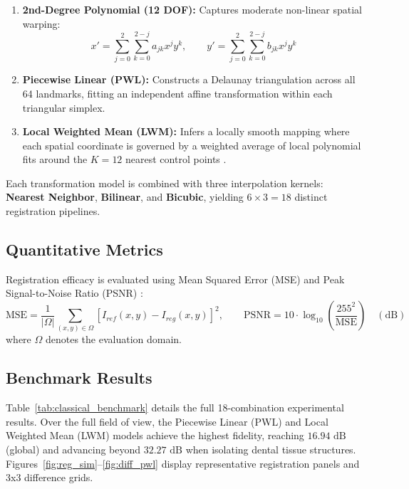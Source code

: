 \documentclass[11pt,a4paper]{article}
\begin{document}
\begin{enumerate}
\begin{equation}
    \end{equation}
    \item \textbf{2nd-Degree Polynomial (12 DOF):} Captures moderate non-linear spatial warping:
    \begin{equation}
        x' = \sum_{j=0}^{2} \sum_{k=0}^{2-j} a_{jk} x^j y^k, \qquad y' = \sum_{j=0}^{2} \sum_{k=0}^{2-j} b_{jk} x^j y^k
    \end{equation}
    \item \textbf{Piecewise Linear (PWL):} Constructs a Delaunay triangulation across all 64 landmarks, fitting an independent affine transformation within each triangular simplex.
    \item \textbf{Local Weighted Mean (LWM):} Infers a locally smooth mapping where each spatial coordinate is governed by a weighted average of local polynomial fits around the $K=12$ nearest control points \cite{goshtasby1988image}.
\end{enumerate}

Each transformation model is combined with three interpolation kernels: \textbf{Nearest Neighbor}, \textbf{Bilinear}, and \textbf{Bicubic}, yielding $6 \times 3 = 18$ distinct registration pipelines.

\subsection{Quantitative Metrics}
Registration efficacy is evaluated using Mean Squared Error (MSE) and Peak Signal-to-Noise Ratio (PSNR) \cite{wang2004image}:
\begin{equation}
    \text{MSE} = \frac{1}{|\Omega|} \sum_{(x,y) \in \Omega} \left[ I_{ref}(x, y) - I_{reg}(x, y) \right]^2, \qquad \text{PSNR} = 10 \cdot \log_{10} \left( \frac{255^2}{\text{MSE}} \right) \quad (\text{dB})
\end{equation}
where $\Omega$ denotes the evaluation domain.

\subsection{Benchmark Results}
Table~\ref{tab:classical_benchmark} details the full 18-combination experimental results. Over the full field of view, the Piecewise Linear (PWL) and Local Weighted Mean (LWM) models achieve the highest fidelity, reaching $16.94\text{ dB}$ (global) and advancing beyond $32.27\text{ dB}$ when isolating dental tissue structures. Figures~\ref{fig:reg_sim}--\ref{fig:diff_pwl} display representative registration panels and 3x3 difference grids.
\end{document}
